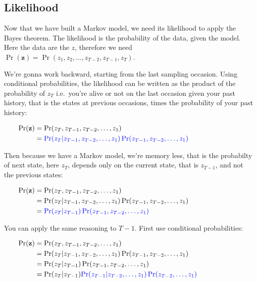 \documentclass[
  12pt,
]{krantz}
\begin{document}
\subsection{Likelihood}\label{likelihood}

Now that we have built a Markov model, we need its likelihood to apply the Bayes theorem. The likelihood is the probability of the data, given the model. Here the data are the \(z\), therefore we need \(\Pr(\mathbf{z}) = \Pr(z_1, z_2, \ldots, z_{T-2}, z_{T-1}, z_T)\).

We're gonna work backward, starting from the last sampling occasion. Using conditional probabilities, the likelihood can be written as the product of the probability of \(z_T\) i.e.~you're alive or not on the last occasion given your past history, that is the states at previous occasions, times the probability of your past history:

\begin{align*}
\Pr(\mathbf{z}) &= \Pr(z_T, z_{T-1}, z_{T-2}, \ldots, z_1) \color{white}{\Pr(z_{T-1}, z_{T-2},\ldots, z_1) \Pr(z_{T-2}, \ldots, z_1)}\\
                &= \color{blue}{\Pr(z_T | z_{T-1}, z_{T-2},\ldots, z_1) \Pr(z_{T-1}, z_{T-2},\ldots, z_1)} \\
\end{align*}

Then because we have a Markov model, we're memory less, that is the probabilty of next state, here \(z_T\), depends only on the current state, that is \(z_{T-1}\), and not the previous states:

\begin{align*}
\Pr(\mathbf{z}) &= \Pr(z_T, z_{T-1}, z_{T-2}, \ldots, z_1) \color{white}{\Pr(z_{T-1}, z_{T-2},\ldots, z_1) \Pr(z_{T-2}, \ldots, z_1)}\\
                &= \Pr(z_T | z_{T-1}, z_{T-2},\ldots, z_1) \Pr(z_{T-1}, z_{T-2},\ldots, z_1) \\
                &= \color{blue}{\Pr(z_T | z_{T-1})} \Pr(z_{T-1}, z_{T-2},\ldots, z_1) \\
\end{align*}

You can apply the same reasoning to \(T-1\). First use conditional probabilities:

\begin{align*}
\Pr(\mathbf{z}) &= \Pr(z_T, z_{T-1}, z_{T-2}, \ldots, z_1) \color{white}{\Pr(z_{T-1}, z_{T-2},\ldots, z_1) \Pr(z_{T-2}, \ldots, z_1)}\\
                &= \Pr(z_T | z_{T-1}, z_{T-2},\ldots, z_1) \Pr(z_{T-1}, z_{T-2},\ldots, z_1) \\
                &= \Pr(z_T | z_{T-1}) \Pr(z_{T-1}, z_{T-2},\ldots, z_1) \\
                &= \Pr(z_T | z_{T-1}) \color{blue}{\Pr(z_{T-1} | z_{T-2}, \ldots, z_1) \Pr(z_{T-2}, \ldots, z_1)}\\
\end{align*}
\end{document}
